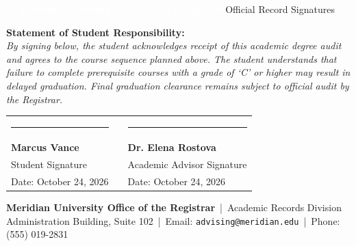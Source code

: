 \documentclass[10pt,a4paper]{article}
\newcommand{\sectiontitle}[2]{%
  \vspace{4pt}%
  \begin{tcolorbox}[
    enhanced,
    colback=NavyPrimary,
    colframe=NavyPrimary,
    arc=3pt,
    top=3.5pt, bottom=3.5pt, left=8pt, right=8pt,
    boxrule=0pt
  ]
    \textcolor{white}{\textbf{\large #1}} \hfill \textcolor{TealAccent!40}{\small #2}
  \end{tcolorbox}%
  \vspace{-2pt}%
}
\newcommand{\statusbadge}[2]{%
  \tcbox[
    on line,
    colback=#1!12,
    colframe=#1!80!black,
    fontupper=\bfseries\tiny,
    top=1.5pt, bottom=1.5pt, left=4pt, right=4pt,
    arc=2pt, boxrule=0.5pt
  ]{\textcolor{#1!90!black}{#2}}%
}
\begin{document}
\vspace{4pt}

\sectiontitle{7. Academic Advising Verification \& Sign-off}{Official Record Signatures}

\vspace{1pt}

\begin{infocard}
  \small
  \textcolor{TextDark}{\textbf{Statement of Student Responsibility:}} \\
  \textcolor{TextMuted}{\textit{By signing below, the student acknowledges receipt of this academic degree audit and agrees to the course sequence planned above. The student understands that failure to complete prerequisite courses with a grade of `C' or higher may result in delayed graduation. Final graduation clearance remains subject to official audit by the Registrar.}}

  \vspace{12pt}

  \begin{tabularx}{\textwidth}{@{} X c X @{}}
    \rule{0.8\linewidth}{0.6pt} & \hspace{20pt} & \rule{0.8\linewidth}{0.6pt} \\
    \textbf{Marcus Vance} & & \textbf{Dr. Elena Rostova} \\
    Student Signature & & Academic Advisor Signature \\[4pt]
    \textcolor{TextMuted}{\scriptsize Date: October 24, 2026} & & \textcolor{TextMuted}{\scriptsize Date: October 24, 2026}
  \end{tabularx}
\end{infocard}

\vspace{4pt}

\begin{tcolorbox}[
  enhanced,
  colback=LightBg,
  colframe=CardBorder,
  arc=3pt,
  boxrule=0.6pt,
  top=3pt, bottom=3pt, left=8pt, right=8pt
]
  \begin{minipage}[c]{0.68\textwidth}
    \scriptsize \textcolor{TextMuted}{
      \textbf{Meridian University Office of the Registrar} \,|\, Academic Records Division \\
      Administration Building, Suite 102 \,|\, Email: \texttt{advising@meridian.edu} \,|\, Phone: (555) 019-2831
    }
  \end{minipage}%
  \hfill
  \begin{minipage}[c]{0.30\textwidth}
    \raggedleft
    \statusbadge{NavyPrimary}{\faSignature\ OFFICIAL RECORD VERIFIED}
  \end{minipage}
\end{tcolorbox}
\end{document}
